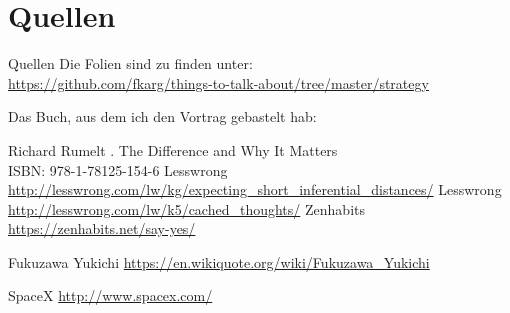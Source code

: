 \section{Quellen}
\begin{frame}{Quellen}
    Die Folien sind zu finden unter: \\
    \url{https://github.com/fkarg/things-to-talk-about/tree/master/strategy}


    Das Buch, aus dem ich den Vortrag gebastelt hab:

    \begin{thebibliography}{10}
    \beamertemplatebookbibitems
        Richard Rumelt
        .
        \newblock The Difference and Why It Matters \\
                  ISBN: 978-1-78125-154-6
    \beamertemplatearticlebibitems
        Lesswrong
            \newblock \url{http://lesswrong.com/lw/kg/expecting\_short\_inferential\_distances/}
        Lesswrong
            \newblock \url{http://lesswrong.com/lw/k5/cached\_thoughts/}
        Zenhabits
            \newblock \url{https://zenhabits.net/say-yes/}

        Fukuzawa Yukichi
            \newblock \url{https://en.wikiquote.org/wiki/Fukuzawa\_Yukichi}

        SpaceX
            \newblock \url{http://www.spacex.com/}

    \end{thebibliography}

\end{frame}
